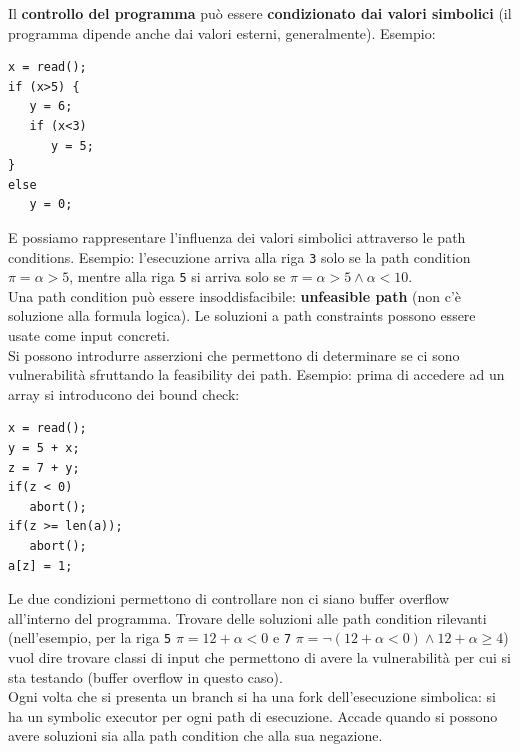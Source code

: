 Il \textbf{controllo del programma} può essere \textbf{condizionato dai valori simbolici} (il programma dipende anche dai valori esterni, generalmente). Esempio:
\begin{center}
	\begin{minipage}{0.3\linewidth}
		\begin{verbatim}
x = read();
if (x>5) {
   y = 6;
   if (x<3)
      y = 5;
} 
else 
   y = 0;
		\end{verbatim}
	\end{minipage}
\end{center}

E possiamo rappresentare l'influenza dei valori simbolici attraverso le path conditions. Esempio: l'esecuzione arriva alla riga \texttt{3} solo se la path condition $\pi = \alpha > 5$, mentre alla riga \texttt{5} si arriva solo se $\pi = \alpha > 5 \wedge \alpha < 10$.\\


Una path condition può essere insoddisfacibile: \textbf{unfeasible path} (non c'è soluzione alla formula logica). Le soluzioni a path constraints possono essere usate come input concreti.\\

Si possono introdurre asserzioni che permettono di determinare se ci sono vulnerabilità sfruttando la feasibility dei path. Esempio: prima di accedere ad un array si introducono dei bound check:
\begin{center}
	\begin{minipage}{0.35\linewidth}
		\begin{verbatim}
x = read();
y = 5 + x;
z = 7 + y;
if(z < 0)
   abort();
if(z >= len(a));
   abort();
a[z] = 1;
		\end{verbatim}
	\end{minipage}
\end{center}

Le due condizioni permettono di controllare non ci siano buffer overflow all'interno del programma. Trovare delle soluzioni alle path condition rilevanti (nell'esempio, per la riga \texttt{5} $\pi  =12 + \alpha < 0$ e \texttt{7} $\pi = \neg (12 + \alpha < 0) \wedge 12 + \alpha \geq 4$) vuol dire trovare classi di input che permettono di avere la vulnerabilità per cui si sta testando (buffer overflow in questo caso).\\

Ogni volta che si presenta un branch si ha una fork dell'esecuzione simbolica: si ha un symbolic executor per ogni path di esecuzione. Accade quando si possono avere soluzioni sia alla path condition che alla sua negazione. \\

